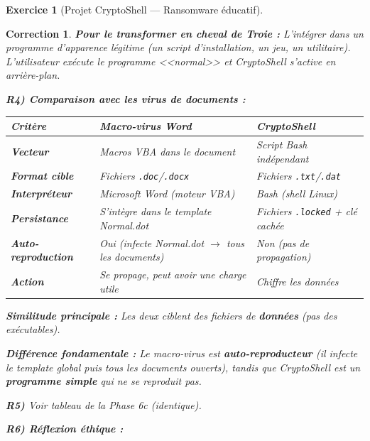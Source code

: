 \documentclass[a4paper,11pt]{article}
\theoremstyle{plain}
\newtheorem{correction}{Correction}
\theoremstyle{definition}
\newtheorem{exercice}{Exercice}
\begin{document}
\begin{exercice}[Projet CryptoShell --- Ransomware éducatif]
\begin{correction}
\textbf{Pour le transformer en cheval de Troie :} L'intégrer dans un programme d'apparence légitime (un script d'installation, un jeu, un utilitaire). L'utilisateur exécute le programme <<normal>> et CryptoShell s'active en arrière-plan.

\medskip
\textbf{R4) Comparaison avec les virus de documents :}

\begin{center}
\begin{tabular}{lp{4.5cm}p{4.5cm}}
\toprule
\textbf{Critère} & \textbf{Macro-virus Word} & \textbf{CryptoShell} \\
\midrule
\textbf{Vecteur} & Macros VBA dans le document & Script Bash indépendant \\
\textbf{Format cible} & Fichiers \texttt{.doc}/\texttt{.docx} & Fichiers \texttt{.txt}/\texttt{.dat} \\
\textbf{Interpréteur} & Microsoft Word (moteur VBA) & Bash (shell Linux) \\
\textbf{Persistance} & S'intègre dans le template Normal.dot & Fichiers \texttt{.locked} + clé cachée \\
\textbf{Auto-reproduction} & Oui (infecte Normal.dot $\to$ tous les documents) & Non (pas de propagation) \\
\textbf{Action} & Se propage, peut avoir une charge utile & Chiffre les données \\
\bottomrule
\end{tabular}
\end{center}

\textbf{Similitude principale :} Les deux ciblent des fichiers de \textbf{données} (pas des exécutables).

\textbf{Différence fondamentale :} Le macro-virus est \textbf{auto-reproducteur} (il infecte le template global puis tous les documents ouverts), tandis que CryptoShell est un \textbf{programme simple} qui ne se reproduit pas.

\medskip
\textbf{R5)} Voir tableau de la Phase 6c (identique).

\medskip
\textbf{R6) Réflexion éthique :}


\end{correction}
\end{exercice}
\end{document}
